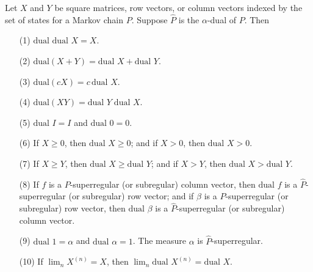 Let $X$ and $Y$ be square matrices, row vectors, or column vectors indexed by the set of states for a Markov chain $P$. Suppose $\hat{P}$ is the $\alpha$-dual of $P$. Then
\begin{enumerate}
\item[(1)] $\text{dual dual } X = X$.
\item[(2)] $\text{dual}(X + Y) = \text{dual } X + \text{dual } Y$.
\item[(3)] $\text{dual}(cX) = c \, \text{dual } X$.
\item[(4)] $\text{dual}(XY) = \text{dual } Y \; \text{dual } X$.
\item[(5)] $\text{dual } I = I$ and $\text{dual } 0 = 0$.
\item[(6)] If $X \geq 0$, then $\text{dual } X \geq 0$; and if $X > 0$, then $\text{dual } X > 0$.
\item[(7)] If $X \geq Y$, then $\text{dual } X \geq \text{dual } Y$; and if $X > Y$, then $\text{dual } X > \text{dual } Y$.
\item[(8)] If $f$ is a $P$-superregular (or subregular) column vector, then $\text{dual } f$ is a $\hat{P}$-superregular (or subregular) row vector; and if $\beta$ is a $P$-superregular (or subregular) row vector, then $\text{dual } \beta$ is a $\hat{P}$-superregular (or subregular) column vector.
\item[(9)] $\text{dual } 1 = \alpha$ and $\text{dual } \alpha = 1$. The measure $\alpha$ is $\hat{P}$-superregular.
\item[(10)] If $\lim_n X^{(n)} = X$, then $\lim_n \text{dual } X^{(n)} = \text{dual } X$.
\end{enumerate}
